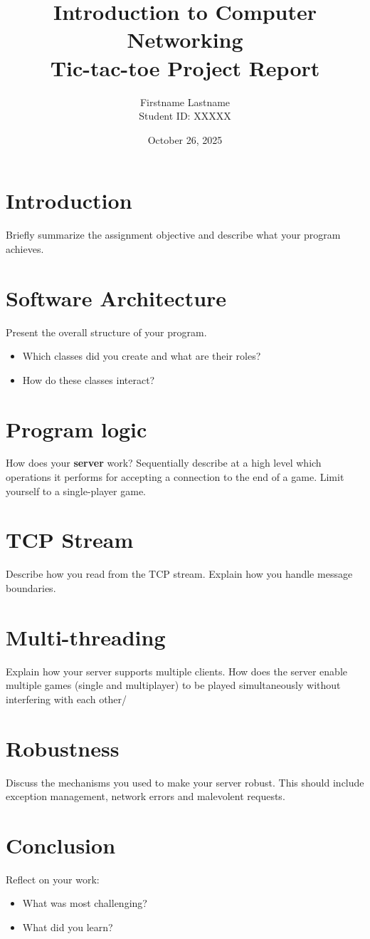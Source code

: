 \documentclass[11pt]{article}
\title{Introduction to Computer Networking\\Tic-tac-toe Project Report}
\author{Firstname Lastname \\ Student ID: XXXXX}
\date{October 26, 2025}
\begin{document}
\maketitle

\section{Introduction}
Briefly summarize the assignment objective and describe what your program achieves.

\section{Software Architecture}
Present the overall structure of your program. 
\begin{itemize}
    \item Which classes did you create and what are their roles?
    \item How do these classes interact?
\end{itemize}

\section{Program logic}
How does your \textbf{server} work? Sequentially describe at a high level which operations it performs for accepting a connection to the end of a game. Limit yourself to a single-player game.


\section{TCP Stream}
Describe how you read from the TCP stream.  
Explain how you handle message boundaries.

\section{Multi-threading}
Explain how your server supports multiple clients.  
How does the server enable multiple games (single and multiplayer) to be played simultaneously without interfering with each other/

\section{Robustness}
Discuss the mechanisms you used to make your server robust. This should include exception management, network errors and malevolent requests.

\section{Conclusion}
Reflect on your work:
\begin{itemize}
    \item What was most challenging?
    \item What did you learn?
\end{itemize}
\end{document}
